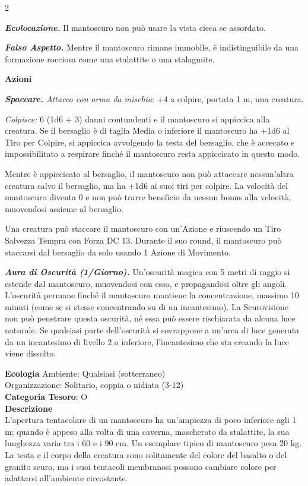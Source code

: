 \begin{multicols}{2}
{\emph{\textbf{Ecolocazione.}} Il mantoscuro non può usare la vista cieca se assordato.

\emph{\textbf{Falso Aspetto.}} Mentre il mantoscuro rimane immobile, è indistinguibile da una formazione rocciosa come una stalattite o una stalagmite.

\textbf{Azioni}

\emph{\textbf{Spaccare.} Attacco con arma da mischia}: +4 a colpire, portata 1 m, una creatura.

\emph{Colpisce:} 6 (1d6 + 3) danni contundenti e il mantoscuro si appiccica alla creatura. Se il bersaglio è di taglia Media o inferiore il mantoscuro ha +1d6 al Tiro per Colpire, si appiccica avvolgendo la testa del bersaglio, che è accecato e impossibilitato a respirare finché il mantoscuro resta appiccicato in questo modo.

Mentre è appiccicato al bersaglio, il mantoscuro non può attaccare nessun'altra creatura salvo il bersaglio, ma ha +1d6 ai suoi tiri per colpire. La velocità del mantoscuro diventa 0 e non può trarre beneficio da nessun bonus alla velocità, muovendosi assieme al bersaglio.

Una creatura può staccare il mantoscuro con un'Azione e riuscendo un Tiro Salvezza Tempra con Forza DC 13. Durante il suo round, il mantoscuro può staccarsi dal bersaglio da solo usando 1 Azione di Movimento.

\emph{\textbf{Aura di Oscurità (1/Giorno).}} Un'oscurità magica con 5 metri di raggio si estende dal mantoscuro, muovendosi con esso, e propagandosi oltre gli angoli. L'oscurità permane finché il mantoscuro mantiene la concentrazione, massimo 10 minuti (come se si stesse concentrando su di un incantesimo). La Scurovisione non può penetrare questa oscurità, né essa può essere rischiarata da alcuna luce naturale. Se qualsiasi parte dell'oscurità si sovrappone a un'area di luce generata da un incantesimo di livello 2 o inferiore, l'incantesimo che sta creando la luce viene dissolto.

\textbf{Ecologia}
Ambiente: Qualsiasi (sotterraneo)\\
Organizzazione: Solitario, coppia o nidiata (3-12)\\
\textbf{Categoria Tesoro}: O\\
\textbf{Descrizione}\\
L'apertura tentacolare di un mantoscuro ha un'ampiezza di poco inferiore agli 1 m; quando è appeso alla volta di una caverna, mascherato da stalattite, la sua lunghezza varia tra i 60 e i 90 cm. Un esemplare tipico di mantoscuro pesa 20 kg. La testa e il corpo della creatura sono solitamente del colore del basalto o del granito scuro, ma i suoi tentacoli membranosi possono cambiare colore per adattarsi all'ambiente circostante.

}
\end{multicols}
